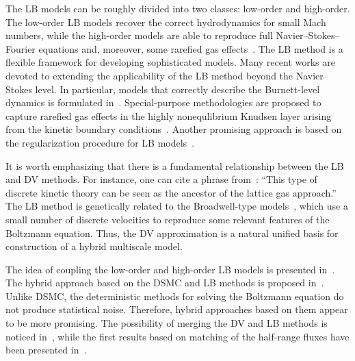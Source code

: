 \documentclass{elsarticle} %
\begin{document}
The LB models can be roughly divided into two classes: low-order and high-order.
The low-order LB models recover the correct hydrodynamics for small Mach numbers,
while the high-order models are able to reproduce full Navier--Stokes--Fourier equations
and, moreover, some rarefied gas effects~\cite{Succi2001, Shan2006}.
The LB method is a flexible framework for developing sophisticated models.
Many recent works are devoted to extending the applicability of the LB method beyond the Navier--Stokes level.
In particular, models that correctly describe the Burnett-level dynamics is formulated in~\cite{Xu2018, Xu2019}.
Special-purpose methodologies are proposed to capture rarefied gas effects in the highly nonequlibrium Knudsen layer
arising from the kinetic boundary conditions~\cite{Feuchter2016, Ambrus2014, Ambrus2016, Ambrus2016mixed}.
Another promising approach is based on the regularization procedure for LB models~\cite{Mont2015}.

It is worth emphasizing that there is a fundamental relationship between the LB and DV methods.
For instance, one can cite a phrase from~\cite{Rivet2001}:
``This type of discrete kinetic theory can be seen as the ancestor of the lattice gas approach.''
The LB method is genetically related to the Broadwell-type models~\cite{Broadwell1964shock, Gatignol1975},
which use a small number of discrete velocities to reproduce some relevant features of the Boltzmann equation.
Thus, the DV approximation is a natural unified basis for construction of a hybrid multiscale model.

The idea of coupling the low-order and high-order LB models is presented in~\cite{Meng2011}.
The hybrid approach based on the DSMC and LB methods is proposed in~\cite{Staso2016long, Staso2018}.
Unlike DSMC, the deterministic methods for solving the Boltzmann equation do not produce statistical noise.
Therefore, hybrid approaches based on them appear to be more promising.
The possibility of merging the DV and LB methods is noticed in~\cite{Succi2016},
while the first results based on matching of the half-range fluxes have been presented in~\cite{Ilyin2018}.

\end{document}
